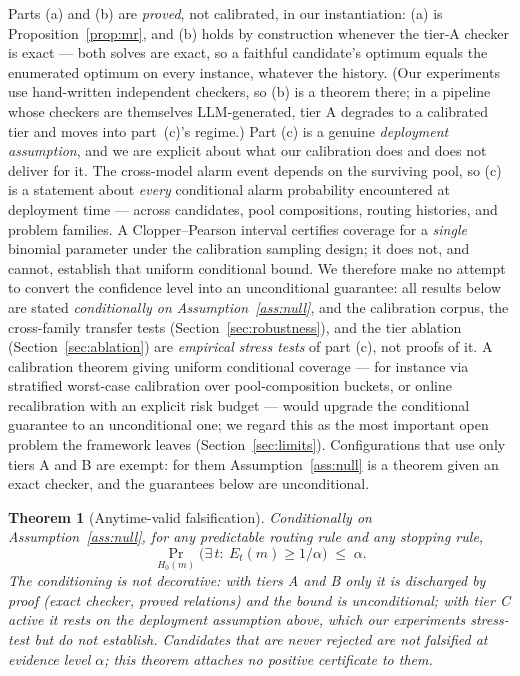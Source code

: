 \documentclass[pdflatex,sn-mathphys-num]{sn-jnl}
\theoremstyle{thmstyleone}
\newtheorem{theorem}{Theorem}
\theoremstyle{thmstyletwo}
\newcommand{\Eproc}{E}
\newcommand{\HO}{H_0}
\begin{document}
Parts (a) and (b) are \emph{proved}, not calibrated, in our
instantiation: (a) is Proposition~\ref{prop:mr}, and (b) holds by
construction whenever the tier-A checker is exact --- both solves are
exact, so a faithful candidate's optimum equals the enumerated
optimum on every instance, whatever the history. (Our experiments use
hand-written independent checkers, so (b) is a theorem there; in a
pipeline whose checkers are themselves LLM-generated, tier A degrades
to a calibrated tier and moves into part~(c)'s regime.) Part (c) is a
genuine \emph{deployment assumption}, and we are explicit about what
our calibration does and does not deliver for it. The cross-model
alarm event depends on the surviving pool, so (c) is a statement
about \emph{every} conditional alarm probability encountered at
deployment time --- across candidates, pool compositions, routing
histories, and problem families. A Clopper--Pearson interval
certifies coverage for a \emph{single} binomial parameter under the
calibration sampling design; it does not, and cannot, establish that
uniform conditional bound. We therefore make no attempt to convert
the confidence level into an unconditional guarantee: all results
below are stated \emph{conditionally on Assumption~\ref{ass:null}},
and the calibration corpus, the cross-family transfer tests
(Section~\ref{sec:robustness}), and the tier ablation
(Section~\ref{sec:ablation}) are \emph{empirical stress tests} of
part (c), not proofs of it. A calibration theorem giving uniform
conditional coverage --- for instance via stratified worst-case
calibration over pool-composition buckets, or online recalibration
with an explicit risk budget --- would upgrade the conditional
guarantee to an unconditional one; we regard this as the most
important open problem the framework leaves
(Section~\ref{sec:limits}). Configurations that use only tiers A and
B are exempt: for them Assumption~\ref{ass:null} is a theorem given
an exact checker, and the guarantees below are unconditional.

\begin{theorem}[Anytime-valid falsification]\label{thm:validity}
\emph{Conditionally on Assumption~\ref{ass:null}}, for any
predictable routing rule and any stopping rule,
\[
\Pr_{\HO(m)}\bigl(\exists\, t:\ \Eproc_t(m) \ge 1/\alpha\bigr)
\;\le\; \alpha .
\]
The conditioning is not decorative: with tiers A and B only it is
discharged by proof (exact checker, proved relations) and the bound
is unconditional; with tier C active it rests on the deployment
assumption above, which our experiments stress-test but do not
establish. Candidates that are never rejected are \emph{not falsified
at evidence level $\alpha$}; this theorem attaches no positive
certificate to them.
\end{theorem}
\end{document}
